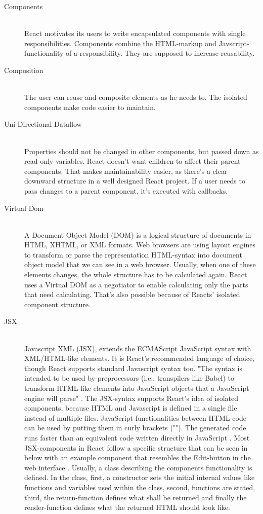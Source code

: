 \begin{description}
    \item[Components] \hfill \\
    React motivates its users to write encapsulated components with single responsibilities. Components combine the HTML-markup and Javscript-functionality of a responsibility. 
    They are supposed to increase reusability. 
    \item[Composition] \hfill \\
    The user can reuse and composite elements as he needs to. 
    The isolated components make code easier to maintain. 
    \item[Uni-Directional Dataflow] \hfill \\
            Properties should not be changed in other components, but passed down as read-only variables. 
            React doesn't want children to affect their parent components. That makes maintainability easier, as there's a clear downward structure in a well designed React project.
            If a user needs to pass changes to a parent component, it's executed with callbacks.
    \item[Virtual Dom]\hfill \\
    A Document Object Model (DOM) is a logical structure of documents in HTML, XHTML, or XML formats. 
    Web browsers are using layout engines to transform or parse the representation HTML-syntax into document object model that we can see in a web browser.
    Usually, when one of these elements changes, the whole structure has to be calculated again. 
    React uses a Virtual DOM as a negotiator to enable calculating only the parts that need calculating. That's also possible because of Reacts' isolated component structure.
    \item[JSX] \hfill \\
	Javascript XML (JSX), extends the ECMAScript JavaScript syntax with XML/HTML-like elements.
	It is React's recommended language of choice, though React supports standard Javascript syntax too.
	"The syntax is intended to be used by preprocessors (i.e., transpilers like Babel) to transform HTML-like 
	elements into JavaScript objects that a JavaScript engine will parse" \parencite{jsx2}.
	The JSX-syntax supports React's idea of isolated components, 
	because HTML and Javascript is defined in a single file instead of multiple files.
	JavaScript functionalities between HTML-code can be used by putting them in curly brackets ("{}").
	The generated code runs faster than an equivalent code written directly in JavaScript \parencite{jsx}.
	Most JSX-components in React follow a specific structure that can be seen in below with an example component that resembles the Edit-button in the web interface .
	Usually, a class describing the components functionality is defined.
	In the class, first, a constructor sets the initial internal values like functions and variables used within the class, 
	second, functions are stated, third, the return-function defines what shall be returned and finally the render-function defines what the returned HTML should look like.
\end{description}
